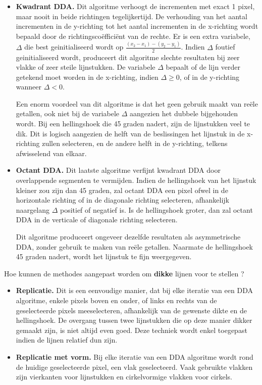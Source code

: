 \documentclass{report}
\begin{document}
\begin{enumerate}
{\begin{itemize}
				\item \textbf{Kwadrant DDA.} Dit algoritme verhoogt de incrementen met exact 1 pixel, maar nooit in beide richtingen tegelijkertijd. De verhouding van het aantal incrementen in de y-richting tot het aantal incrementen in de x-richting wordt bepaald door de richtingscoëfficiënt van de rechte. Er is een extra variabele, $\Delta$ die best geinitialiseerd wordt op $\frac{(x_2 - x_1) - (y_2 - y_1)}{2}$. Indien $\Delta$ foutief geinitialiseerd wordt, produceert dit algoritme slechte resultaten bij zeer vlakke of zeer steile lijnstukken. De variabele $\Delta$ bepaalt of de lijn verder getekend moet worden in de x-richting, indien $\Delta \geq 0$, of in de y-richting wanneer $\Delta < 0$.
				
				 Een enorm voordeel van dit algoritme is dat het geen gebruik maakt van reële getallen, ook niet bij de  variabele $\Delta$ aangezien het dubbele bijgehouden wordt. Bij een hellingshoek die 45 graden nadert, zijn de lijnstukken veel te dik. Dit is logisch aangezien de helft van de beslissingen het lijnstuk in de x-richting zullen selecteren, en de andere helft in de y-richting, telkens afwisselend van elkaar.
				
				\item \textbf{Octant DDA.} Dit laatste algoritme verfijnt kwadrant DDA door overlappende segmenten te vermijden. Indien de hellingshoek van het lijnstuk kleiner zou zijn dan 45 graden, zal octant DDA een pixel ofwel in de horizontale richting of in de diagonale richting selecteren, afhankelijk naargelang $\Delta$ positief of negatief is. Is de hellingshoek groter, dan zal octant DDA in de verticale of diagonale richting selecteren. 
				
				Dit algoritme produceert ongeveer dezelfde resultaten als asymmetrische DDA, zonder gebruik te maken van reële getallen. Naarmate de hellingshoek 45 graden nadert, wordt het lijnstuk te fijn weergegeven.
			\end{itemize}
		}
	
		
		\vraag
		{
			Hoe kunnen de methodes aangepast worden om \textbf{dikke} lijnen voor te stellen ? 
		}
		{
			\begin{itemize}
				\item \textbf{Replicatie.} Dit is een eenvoudige manier, dat bij elke iteratie van een DDA algoritme, enkele pixels boven en onder, of links en rechts van de geselecteerde pixels meeselecteren, afhankelijk van de gewenste dikte en de hellingshoek. De overgang tussen twee lijnstukken die op deze manier dikker gemaakt zijn, is niet altijd even goed. Deze techniek wordt enkel toegepast indien de lijnen relatief dun zijn.
				\item \textbf{Replicatie met vorm.} Bij elke iteratie van een DDA algoritme wordt rond de huidige geselecteerde pixel, een vlak geselecteerd. Vaak gebruikte vlakken zijn vierkanten voor lijnstukken en cirkelvormige vlakken voor cirkels.
				

\end{itemize}}
\end{enumerate}
\end{document}
